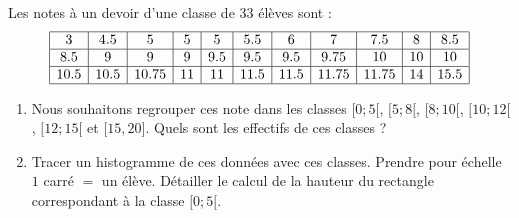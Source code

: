 
\begin{exercice}\label{exosmath-0668}

    Les notes à un devoir d'une classe de \( 33\) élèves sont :
    \begin{equation*}
        \begin{array}[]{|c|c|c|c|c|c|c|c|c|c|c|}
            \hline
            3&4.5    &5&5&5&5.5&6&7&7.5   &8&8.5\\
            \hline
            8.5&9&9&9&9.5&9.5&9.5&9.75    &10&10&10\\
            \hline
            10.5&10.5&10.75&11&11&11.5&11.5&11.75&11.75&14&15.5\\
            \hline
        \end{array}
    \end{equation*}
    \begin{enumerate}
        \item
            Nous souhaitons regrouper ces note dans les classes \( \mathopen[ 0 ;5 [\), \( \mathopen[ 5 ;8 [\), \( \mathopen[ 8 ; 10 [\), \( \mathopen[ 10; 12 [\), \( \mathopen[ 12 ; 15 [\) et \( \mathopen[ 15 , 20 \mathclose]\). Quels sont les effectifs de ces classes ?
        \item
            Tracer un histogramme de ces données avec ces classes. Prendre pour échelle \( 1\) carré \( =\) un élève. Détailler le calcul de la hauteur du rectangle correspondant à la classe \( \mathopen[ 0 ;5 [\).
    \end{enumerate}

\end{exercice}
